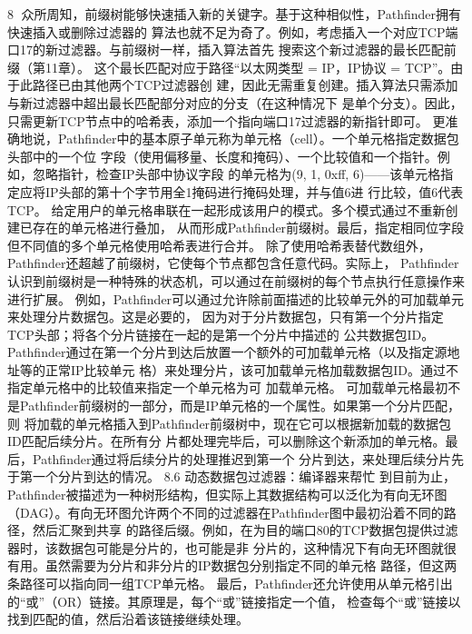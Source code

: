                                                      8
众所周知，前缀树能够快速插入新的关键字。基于这种相似性，Pathfinder拥有快速插入或删除过滤器的
算法也就不足为奇了。例如，考虑插入一个对应TCP端口17的新过滤器。与前缀树一样，插入算法首先
搜索这个新过滤器的最长匹配前缀（第11章）。
这个最长匹配对应于路径“以太网类型 = IP，IP协议 = TCP”。由于此路径已由其他两个TCP过滤器创
建，因此无需重复创建。插入算法只需添加与新过滤器中超出最长匹配部分对应的分支（在这种情况下
是单个分支）。因此，只需更新TCP节点中的哈希表，添加一个指向端口17过滤器的新指针即可。
更准确地说，Pathfinder中的基本原子单元称为单元格（cell）。一个单元格指定数据包头部中的一个位
字段（使用偏移量、长度和掩码）、一个比较值和一个指针。例如，忽略指针，检查IP头部中协议字段
的单元格为(9, 1, 0xff, 6)——该单元格指定应将IP头部的第十个字节用全1掩码进行掩码处理，并与值6进
行比较，值6代表TCP。
给定用户的单元格串联在一起形成该用户的模式。多个模式通过不重新创建已存在的单元格进行叠加，
从而形成Pathfinder前缀树。最后，指定相同位字段但不同值的多个单元格使用哈希表进行合并。
除了使用哈希表替代数组外，Pathfinder还超越了前缀树，它使每个节点都包含任意代码。实际上，
Pathfinder认识到前缀树是一种特殊的状态机，可以通过在前缀树的每个节点执行任意操作来进行扩展。
例如，Pathfinder可以通过允许除前面描述的比较单元外的可加载单元来处理分片数据包。这是必要的，
因为对于分片数据包，只有第一个分片指定TCP头部；将各个分片链接在一起的是第一个分片中描述的
公共数据包ID。
Pathfinder通过在第一个分片到达后放置一个额外的可加载单元格（以及指定源地址等的正常IP比较单元
格）来处理分片，该可加载单元格加载数据包ID。通过不指定单元格中的比较值来指定一个单元格为可
加载单元格。
可加载单元格最初不是Pathfinder前缀树的一部分，而是IP单元格的一个属性。如果第一个分片匹配，则
将加载的单元格插入到Pathfinder前缀树中，现在它可以根据新加载的数据包ID匹配后续分片。在所有分
片都处理完毕后，可以删除这个新添加的单元格。最后，Pathfinder通过将后续分片的处理推迟到第一个
分片到达，来处理后续分片先于第一个分片到达的情况。
8.6 动态数据包过滤器：编译器来帮忙
到目前为止，Pathfinder被描述为一种树形结构，但实际上其数据结构可以泛化为有向无环图
（DAG）。有向无环图允许两个不同的过滤器在Pathfinder图中最初沿着不同的路径，然后汇聚到共享
的路径后缀。例如，在为目的端口80的TCP数据包提供过滤器时，该数据包可能是分片的，也可能是非
分片的，这种情况下有向无环图就很有用。虽然需要为分片和非分片的IP数据包分别指定不同的单元格
路径，但这两条路径可以指向同一组TCP单元格。
最后，Pathfinder还允许使用从单元格引出的“或”（OR）链接。其原理是，每个“或”链接指定一个值，
检查每个“或”链接以找到匹配的值，然后沿着该链接继续处理。

